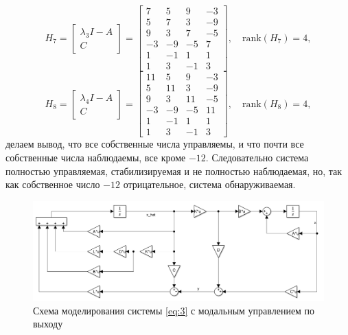 \begin{equation*}
H_7 = \begin{bmatrix}
    \lambda_3 I - A \\ C
    \end{bmatrix} =
\begin{bmatrix}
7 & 5 & 9 & -3 \\
5 & 7 & 3 & -9 \\
9 & 3 & 7 & -5 \\
-3 & -9 & -5 & 7 \\
1 & -1 & 1 & 1 \\
1 & 3 & -1 & 3
\end{bmatrix},\quad
\text{rank}(H_7) = 4,
\end{equation*}
\begin{equation*}
H_8 = \begin{bmatrix}
    \lambda_4 I - A \\ C
    \end{bmatrix} =
\begin{bmatrix}
11 & 5 & 9 & -3 \\
5 & 11 & 3 & -9 \\
9 & 3 & 11 & -5 \\
-3 & -9 & -5 & 11 \\
1 & -1 & 1 & 1 \\
1 & 3 & -1 & 3
\end{bmatrix},\quad
\text{rank}(H_8) = 4,
\end{equation*}
делаем вывод, что все собственные числа управляемы,
и что почти все собственные числа наблюдаемы, все кроме $-12$.
Следовательно система полностью управляемая, стабилизируемая и не полностью
наблюдаемая, но, так как собственное число $-12$ отрицательное, система
обнаруживаемая.

\begin{figure}[H]
    \centering
    \includegraphics[width=\linewidth]{figs/task3_slx.png}
    \caption{Схема моделирования системы \ref{eq:3} с модальным
    управлением по выходу}
    \label{fig:3}
\end{figure}

